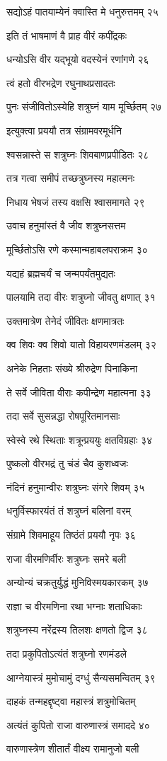 सद्योऽहं पातयाम्येनं क्वास्ति मे धनुरुत्तमम् २५

इति तं भाषमाणं वै प्राह वीरं कपींद्रकः

धन्योऽसि वीर यद्भूयो वदस्येनं रणांगणे २६

त्वं हतो वीरभद्रेण रघुनाथप्रसादतः

पुनः संजीवितोऽस्येहि शत्रुघ्नं याम मूर्च्छितम् २७

इत्युक्त्वा प्रययौ तत्र संग्रामवरमूर्धनि

श्वसन्नास्ते स शत्रुघ्नः शिवबाणप्रपीडितः २८

तत्र गत्वा समीपं तच्छत्रुघ्नस्य महात्मनः

निधाय भेषजं तस्य वक्षसि श्वासमागते २९

उवाच हनुमांस्तं वै जीव शत्रुघ्नसत्तम

मूर्च्छितोऽसि रणे कस्मान्महाबलपराक्रम ३०

यद्यहं ब्रह्मचर्यं च जन्मपर्यंतमुद्यतः

पालयामि तदा वीरः शत्रुघ्नो जीवतु क्षणात् ३१

उक्तमात्रेण तेनेदं जीवितः क्षणमात्रतः

क्व शिवः क्व शिवो यातो विहायरणमंडलम् ३२

अनेके निहताः संख्ये श्रीरुद्रेण पिनाकिना

ते सर्वे जीविता वीराः कपीन्द्रेण महात्मना ३३

तदा सर्वे सुसन्नद्धा रोषपूरितमानसाः

स्वेस्वे रथे स्थिताः शत्रून्प्रययुः क्षतविग्रहाः ३४

पुष्कलो वीरभद्रं तु चंडं चैव कुशध्वजः

नंदिनं हनुमान्वीरः शत्रुघ्नः संगरे शिवम् ३५

धनुर्विस्फारयंतं तं शत्रुघ्नं बलिनां वरम्

संग्रामे शिवमाहूय तिष्ठंतं प्रययौ नृपः ३६

राजा वीरमणिर्वीरः शत्रुघ्नः समरे बली

अन्योन्यं चक्रतुर्युद्धं मुनिविस्मयकारकम् ३७

राज्ञा च वीरमणिना रथा भग्नाः शताधिकाः

शत्रुघ्नस्य नरेंद्रस्य तिलशः क्षणतो द्विज ३८

तदा प्रकुपितोऽत्यंतं शत्रुघ्नो रणमंडले

आग्नेयास्त्रं मुमोचामुं दग्धुं सैन्यसमन्वितम् ३९

दाहकं तन्महद्दृष्ट्वा महास्त्रं शत्रुमोचितम्

अत्यंतं कुपितो राजा वारुणास्त्रं समाददे ४०

वारुणास्त्रेण शीतार्तं वीक्ष्य रामानुजो बली

